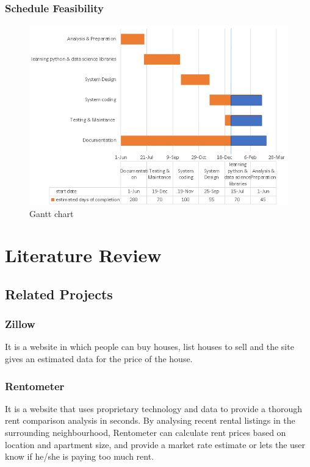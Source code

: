 \subsection{Schedule Feasibility}
\begin{figure}[tbh] %
\begin{center}
	\includegraphics[scale=2]{Untitled.png} 
	\caption{Gantt chart} %
	\label{Figure 1} %
\end{center}
\end{figure}
\chapter{Literature Review}
\section{Related Projects}
\subsection{Zillow}
It is a website in which people can buy houses, list houses to sell and the site gives an estimated data for the price of the house.
\subsection{Rentometer}
It is a website that uses proprietary technology and data to provide a thorough rent comparison analysis in seconds. By analysing recent rental listings in the surrounding neighbourhood, Rentometer can calculate rent prices based on location and apartment size, and provide a market rate estimate or lets the user know if he/she is paying too much rent.
